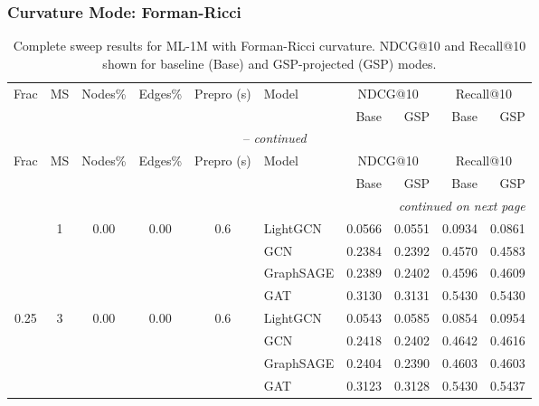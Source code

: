 \subsubsection*{Curvature Mode: Forman-Ricci}
{\footnotesize
\setlength{\tabcolsep}{4pt}
\begin{longtable}{cccccl rrrr}
\caption{Complete sweep results for ML-1M with Forman-Ricci curvature. NDCG@10 and Recall@10 shown for baseline (Base) and GSP-projected (GSP) modes.} \label{tab:ml1m_forman_ricci_sweep} \\
\toprule
\multirow{2}{*}{Frac} & \multirow{2}{*}{MS} & \multirow{2}{*}{Nodes\%} & \multirow{2}{*}{Edges\%} & \multirow{2}{*}{Prepro (s)} & \multirow{2}{*}{Model} & \multicolumn{2}{c}{NDCG@10} & \multicolumn{2}{c}{Recall@10} \\
\cmidrule(lr){7-8}\cmidrule(lr){9-10}
 & & & & & & Base & GSP & Base & GSP \\
\midrule
\endfirsthead
\multicolumn{10}{c}{\tablename~\thetable{} -- \textit{continued}} \\
\toprule
\multirow{2}{*}{Frac} & \multirow{2}{*}{MS} & \multirow{2}{*}{Nodes\%} & \multirow{2}{*}{Edges\%} & \multirow{2}{*}{Prepro (s)} & \multirow{2}{*}{Model} & \multicolumn{2}{c}{NDCG@10} & \multicolumn{2}{c}{Recall@10} \\
\cmidrule(lr){7-8}\cmidrule(lr){9-10}
 & & & & & & Base & GSP & Base & GSP \\
\midrule
\endhead
\midrule \multicolumn{10}{r}{\textit{continued on next page}} \\
\endfoot
\bottomrule
\endlastfoot
\multirow{4}{*}{0.25} & \multirow{4}{*}{1} & \multirow{4}{*}{0.00} & \multirow{4}{*}{0.00} & \multirow{4}{*}{0.6} & LightGCN & 0.0566 & 0.0551 & 0.0934 & 0.0861 \\
 & & & & & GCN & 0.2384 & 0.2392 & 0.4570 & 0.4583 \\
 & & & & & GraphSAGE & 0.2389 & 0.2402 & 0.4596 & 0.4609 \\
 & & & & & GAT & 0.3130 & 0.3131 & 0.5430 & 0.5430 \\
\midrule
\multirow{4}{*}{0.25} & \multirow{4}{*}{3} & \multirow{4}{*}{0.00} & \multirow{4}{*}{0.00} & \multirow{4}{*}{0.6} & LightGCN & 0.0543 & 0.0585 & 0.0854 & 0.0954 \\
 & & & & & GCN & 0.2418 & 0.2402 & 0.4642 & 0.4616 \\
 & & & & & GraphSAGE & 0.2404 & 0.2390 & 0.4603 & 0.4603 \\
 & & & & & GAT & 0.3123 & 0.3128 & 0.5430 & 0.5437 \\

\end{longtable}}
